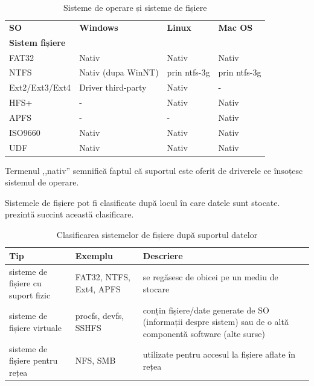 \begin{table}[htb]
  \begin{center}
    \begin{tabular}{ p{} p{} p{} p{} }
      \toprule
        \textbf{SO} &
        \textbf{Windows} &
        \textbf{Linux} &
        \textbf{Mac OS} \\
        \textbf{Sistem fișiere} &
        &
        &
        \\
      \midrule
        FAT32 &
        Nativ &
        Nativ &
        Nativ \\
      \midrule
        NTFS &
        Nativ (dupa WinNT) &
        prin ntfs-3g &
        prin ntfs-3g \\
      \midrule
        Ext2/Ext3/Ext4 &
        Driver third-party &
        Nativ &
        - \\
      \midrule
        HFS+ &
        - &
        Nativ &
        Nativ \\
      \midrule
        APFS &
        - &
        - &
        Nativ \\
      \midrule
        ISO9660 &
        Nativ &
        Nativ &
        Nativ \\
      \midrule
        UDF &
        Nativ &
        Nativ &
        Nativ \\
      \bottomrule
    \end{tabular}
  \end{center}
  \caption{Sisteme de operare și sisteme de fișiere}
  \label{table:fs:os-fs}
\end{table}

Termenul ,,nativ'' semnifică faptul că suportul este oferit de driverele ce însoțesc sistemul de operare.

Sistemele de fișiere pot fi clasificate după locul în care datele sunt stocate.
 prezintă succint această clasificare.

\begin{table}[htb]
  \begin{center}
    \begin{tabular}{ p{} p{} p{} }
      \toprule
        \textbf{Tip} &
        \textbf{Exemplu} &
        \textbf{Descriere} \\
      \midrule
        sisteme de fișiere cu suport fizic &
         FAT32, NTFS, Ext4, APFS &
        se regăsesc de obicei pe un mediu de stocare \\
      \midrule
        sisteme de fișiere virtuale &
        procfs, devfs, SSHFS &
        conțin fișiere/date generate de SO (informații despre sistem) sau de o altă componentă software (alte surse) \\
      \midrule
        sisteme de fișiere pentru rețea &
        NFS, SMB &
        utilizate pentru accesul la fișiere aflate în rețea \\
      \bottomrule
    \end{tabular}
  \end{center}
  \caption{Clasificarea sistemelor de fișiere după suportul datelor}
  \label{table:fs:fs-storage}
\end{table}


